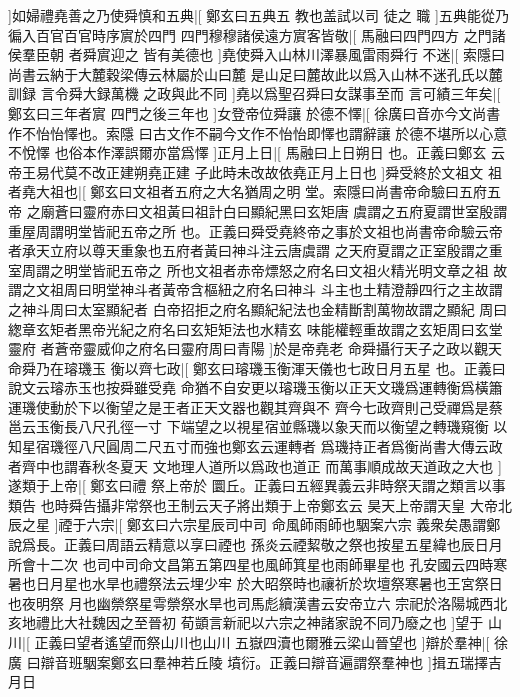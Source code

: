 %
]如婦禮堯善之乃使舜慎和五典|[%
鄭玄曰五典五%
教也盖試以司%
%
徒之%
職%
]五典能從乃徧入百官百官時序賔於四門%
%
四門穆穆諸侯遠方賔客皆敬|[%
馬融曰四門四方%
之門諸侯羣臣朝%
%
者舜賔迎之%
皆有美德也%
]堯使舜入山林川澤暴風雷雨舜行%
%
不迷|[%
索隱曰尚書云納于大麓穀梁傳云林屬於山曰麓%
是山足曰麓故此以爲入山林不迷孔氏以麓訓録%
%
言令舜大録萬機%
之政與此不同%
]堯以爲聖召舜曰女謀事至而%
%
言可績三年矣|[%
鄭玄曰三年者賔%
四門之後三年也%
]女登帝位舜讓%
%
於德不懌|[%
徐廣曰音亦今文尚書作不怡怡懌也。索隱%
曰古文作不嗣今文作不怡怡即懌也謂辭讓%
%
於德不堪所以心意不悅懌%
也俗本作澤誤爾亦當爲懌%
]正月上日|[%
馬融曰上日朔日%
也。正義曰鄭玄%
%
云帝王易代莫不改正建朔堯正建%
子此時未改故依堯正月上日也%
]舜受終於文祖文%
%
祖者堯大祖也|[%
鄭玄曰文祖者五府之大名猶周之明%
堂。索隱曰尚書帝命驗曰五府五帝%
%
之廟蒼曰靈府赤曰文祖黃曰祖計白曰顯紀黑曰玄矩唐%
虞謂之五府夏謂世室殷謂重屋周謂明堂皆祀五帝之所%
%
也。正義曰舜受堯終帝之事於文祖也尚書帝命驗云帝%
者承天立府以尊天重象也五府者黃曰神斗注云唐虞謂%
%
之天府夏謂之正室殷謂之重室周謂之明堂皆祀五帝之%
所也文祖者赤帝熛怒之府名曰文祖火精光明文章之祖%
%
故謂之文祖周曰明堂神斗者黃帝含樞紐之府名曰神斗%
斗主也土精澄靜四行之主故謂之神斗周曰太室顯紀者%
%
白帝招拒之府名顯紀紀法也金精斷割萬物故謂之顯紀%
周曰緫章玄矩者黑帝光紀之府名曰玄矩矩法也水精玄%
%
味能權輕重故謂之玄矩周曰玄堂靈府%
者蒼帝靈威仰之府名曰靈府周曰青陽%
]於是帝堯老%
%
命舜攝行天子之政以觀天命舜乃在璿璣玉%
%
衡以齊七政|[%
鄭玄曰璿璣玉衡渾天儀也七政日月五星%
也。正義曰說文云璿赤玉也按舜雖受堯%
%
命猶不自安更以璿璣玉衡以正天文璣爲運轉衡爲橫簫%
運璣使動於下以衡望之是王者正天文器也觀其齊與不%
%
齊今七政齊則己受禪爲是蔡邕云玉衡長八尺孔徑一寸%
下端望之以視星宿並縣璣以象天而以衡望之轉璣窺衡%
%
以知星宿璣徑八尺圓周二尺五寸而強也鄭玄云運轉者%
爲璣持正者爲衡尚書大傳云政者齊中也謂春秋冬夏天%
%
文地理人道所以爲政也道正%
而萬事順成故天道政之大也%
]遂類于上帝|[%
鄭玄曰禮%
祭上帝於%
%
圜丘。正義曰五經異義云非時祭天謂之類言以事類告%
也時舜告攝非常祭也王制云天子將出類于上帝鄭玄云%
%
昊天上帝謂天皇%
大帝北辰之星%
]禋于六宗|[%
鄭玄曰六宗星辰司中司%
命風師雨師也駰案六宗%
%
義衆矣愚謂鄭說爲長。正義曰周語云精意以享曰禋也%
孫炎云禋絜敬之祭也按星五星緯也辰日月所會十二次%
%
也司中司命文昌第五第四星也風師箕星也雨師畢星也%
孔安國云四時寒暑也日月星也水旱也禮祭法云埋少牢%
%
於大昭祭時也禳祈於坎壇祭寒暑也王宮祭日也夜明祭%
月也幽禜祭星雩禜祭水旱也司馬彪續漢書云安帝立六%
%
宗祀於洛陽城西北亥地禮比大社魏因之至晉初%
荀顗言新祀以六宗之神諸家說不同乃廢之也%
]望于%
%
山川|[%
正義曰望者遙望而祭山川也山川%
五嶽四瀆也爾雅云梁山晉望也%
]辯於羣神|[%
徐%
廣%
%
曰辯音班駰案鄭玄曰羣神若丘陵%
墳衍。正義曰辯音遍謂祭羣神也%
]揖五瑞擇吉月日%
